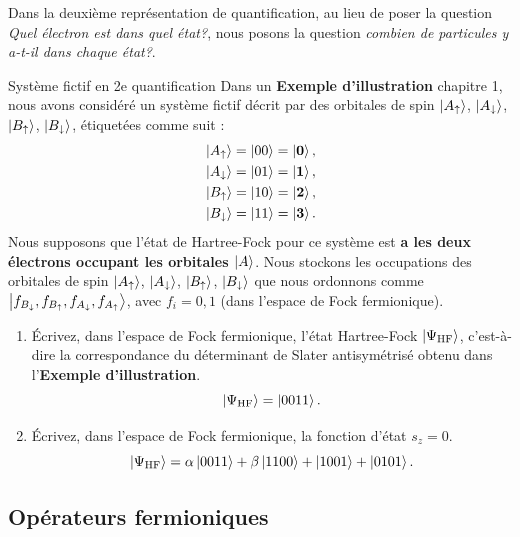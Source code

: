 \documentclass[12pt,a4paper,svgnames,x11names,rgb,table]{article} %
\numberwithin{equation}{section} %
\numberwithin{figure}{section} %
\numberwithin{table}{section} %
\begin{document}
Dans la deuxième représentation de quantification, au lieu de poser la question \textit{Quel électron est dans quel état?}, nous posons la question \textit{combien de particules y a-t-il dans chaque état?}.

\begin{example}{Système fictif en 2e quantification}{}
Dans un \textbf{Exemple d'illustration} chapitre 1, nous avons considéré un système fictif décrit par des orbitales de spin $\ket{A_\uparrow}$, $\ket{A_\downarrow}$, $\ket{B_\uparrow}$, $\ket{B_\downarrow}$, étiquetées comme suit :
\begin{align}
\label{eq:spin_orbitals}
& \ket{A_\uparrow} = \ket{00} = \ket{\mathbf{0}}, \\
& \ket{A_\downarrow} = \ket{01} = \ket{\mathbf{1}}, \\
& \ket{B_\uparrow} = \ket{10} = \ket{\mathbf{2}}, \\
& \ket{B_\downarrow} = \ket{11} = \ket{\mathbf{3}}.
\end{align}
Nous supposons que l'état de Hartree-Fock pour ce système est \textbf{a les deux électrons occupant les orbitales $\ket{A}$}. Nous stockons les occupations des orbitales de spin $\ket{A_\uparrow}$, $\ket{A_\downarrow}$, $\ket{B_\uparrow}$, $\ket{B_\downarrow}$ que nous ordonnons comme $\ket{f_{B_\downarrow}, f_{B_\uparrow}, f_{A_\downarrow}, f_{A_\uparrow}}$, avec $f_i = 0, 1$ (dans l'espace de Fock fermionique).

\begin{enumerate}
    \item Écrivez, dans l'espace de Fock fermionique, l'état Hartree-Fock $\ket{\Psi_{\rm HF}}$, c'est-à-dire la correspondance du déterminant de Slater antisymétrisé obtenu dans l'\textbf{Exemple d'illustration}.
    \begin{equation}\label{eq:hf_state}
    \ket{\Psi_{\rm HF}} = \ket{0011}.
    \end{equation}
    \item Écrivez, dans l'espace de Fock fermionique, la fonction d'état $s_z = 0$.
    \begin{equation}
    \label{eq:sz_state}
    \ket{\Psi_{\rm HF}} = \alpha \ket{0011} + \beta \ket{1100} + \ket{1001} + \ket{0101}.
    \end{equation}
\end{enumerate}
\end{example}

\subsection{Opérateurs fermioniques}
\end{document}
